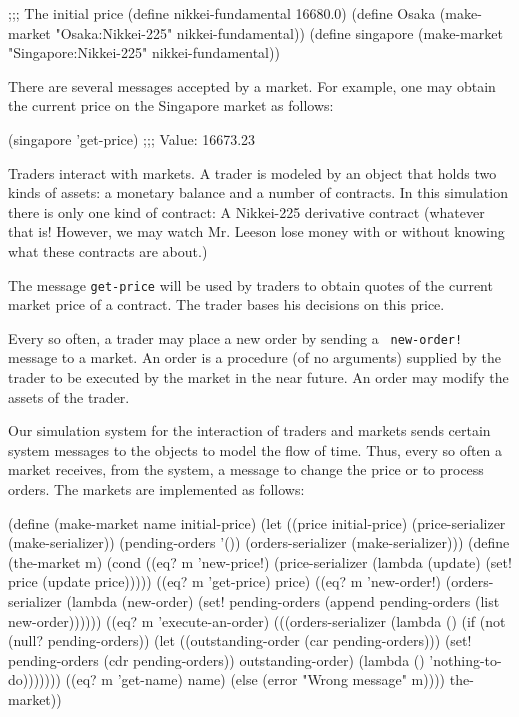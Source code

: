 \beginlisp
;;; The initial price
(define nikkei-fundamental 16680.0)
\null
(define Osaka
  (make-market "Osaka:Nikkei-225" nikkei-fundamental))
\null
(define singapore
  (make-market "Singapore:Nikkei-225" nikkei-fundamental))
\endlisp

There are several messages accepted by a market.  For example, one may
obtain the current price on the Singapore market as follows:

\beginlisp 
(singapore 'get-price)
;;; Value: 16673.23
\endlisp

Traders interact with markets.  A trader is modeled by an object that
holds two kinds of assets: a monetary balance and a number of
contracts.  In this simulation there is only one kind of contract: A
Nikkei-225 derivative contract (whatever that is!  However, we may
watch Mr. Leeson lose money with or without knowing what these
contracts are about.)

The message {\tt get-price} will be used by traders to obtain quotes
of the current market price of a contract.  The trader bases his
decisions on this price.

Every so often, a trader may place a new order by sending a {\tt
new-order!} message to a market.  An order is a procedure (of no
arguments) supplied by the trader to be executed by the market in the
near future.  An order may modify the assets of the trader.

Our simulation system for the interaction of traders and markets sends
certain system messages to the objects to model the flow of time.
Thus, every so often a market receives, from the system, a message to
change the price or to process orders.  The markets are implemented as
follows:

\beginlisp
(define (make-market name initial-price)
  (let ((price initial-price)
        (price-serializer (make-serializer))
        (pending-orders '())
        (orders-serializer (make-serializer)))
    (define (the-market m)
      (cond ((eq? m 'new-price!)        
             (price-serializer
              (lambda (update)
                (set! price (update price)))))
            ((eq? m 'get-price) price)
            ((eq? m 'new-order!)
             (orders-serializer
              (lambda (new-order)
                (set! pending-orders
                      (append pending-orders (list new-order))))))
            ((eq? m 'execute-an-order)
             (((orders-serializer
                (lambda ()
                  (if (not (null? pending-orders))
                      (let ((outstanding-order (car pending-orders)))
                        (set! pending-orders (cdr pending-orders))
                        outstanding-order)
                      (lambda () 'nothing-to-do)))))))
            ((eq? m 'get-name) name)
            (else (error "Wrong message" m))))
    the-market))
\endlisp

